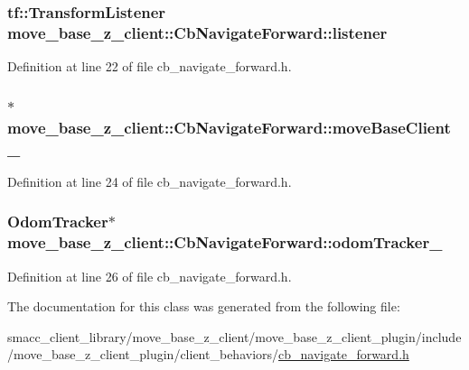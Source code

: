 \subsubsection[{\texorpdfstring{listener}{listener}}]{\setlength{\rightskip}{0pt plus 5cm}tf\+::\+Transform\+Listener move\+\_\+base\+\_\+z\+\_\+client\+::\+Cb\+Navigate\+Forward\+::listener}\hypertarget{classmove__base__z__client_1_1CbNavigateForward_afa40fd805d66eb09e9b4b1bd8356b2a5}{}\label{classmove__base__z__client_1_1CbNavigateForward_afa40fd805d66eb09e9b4b1bd8356b2a5}


Definition at line 22 of file cb\+\_\+navigate\+\_\+forward.\+h.

\subsubsection[{\texorpdfstring{move\+Base\+Client\+\_\+}{moveBaseClient_}}]{$\ast$ move\+\_\+base\+\_\+z\+\_\+client\+::\+Cb\+Navigate\+Forward\+::move\+Base\+Client\+\_\+}\hypertarget{classmove__base__z__client_1_1CbNavigateForward_ab3b4592cd7f30b490a0549f2ee67c389}{}\label{classmove__base__z__client_1_1CbNavigateForward_ab3b4592cd7f30b490a0549f2ee67c389}


Definition at line 24 of file cb\+\_\+navigate\+\_\+forward.\+h.

\subsubsection[{\texorpdfstring{odom\+Tracker\+\_\+}{odomTracker_}}]{\setlength{\rightskip}{0pt plus 5cm}Odom\+Tracker$\ast$ move\+\_\+base\+\_\+z\+\_\+client\+::\+Cb\+Navigate\+Forward\+::odom\+Tracker\+\_\+}\hypertarget{classmove__base__z__client_1_1CbNavigateForward_ae5573b288a966114a875d5b79a6c7924}{}\label{classmove__base__z__client_1_1CbNavigateForward_ae5573b288a966114a875d5b79a6c7924}


Definition at line 26 of file cb\+\_\+navigate\+\_\+forward.\+h.



The documentation for this class was generated from the following file\+:\begin{DoxyCompactItemize}
\item 
smacc\+\_\+client\+\_\+library/move\+\_\+base\+\_\+z\+\_\+client/move\+\_\+base\+\_\+z\+\_\+client\+\_\+plugin/include/move\+\_\+base\+\_\+z\+\_\+client\+\_\+plugin/client\+\_\+behaviors/\hyperlink{cb__navigate__forward_8h}{cb\+\_\+navigate\+\_\+forward.\+h}\end{DoxyCompactItemize}
